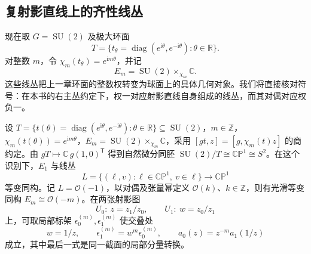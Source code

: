 \subsection{复射影直线上的齐性线丛}
\label{g1:subsec:2003:04}
现在取 \(G=\operatorname{SU}(2)\) 及极大环面
\[
	T=\{t_\theta=\operatorname{diag}(e^{\mathrm{i}\theta},e^{-\mathrm{i}\theta}):\theta\in\mathbb R\}.
\]
对整数 \(m\)，令 \(\chi_m(t_\theta)=e^{\mathrm{i}m\theta}\)，并记
\[
	E_m=\operatorname{SU}(2)\times_{\chi_m}\mathbb C.
\]
这些线丛把上一章环面的整数权转变为球面上的具体几何对象。我们将直接核对符号：在本书的右主丛约定下，权一对应射影直线自身组成的线丛，而其对偶对应权负一。

\begin{proposition}\label{g1:prop:su2-hopf-associated-lines}
	设 \(T=\{t(\theta)=\operatorname{diag}(e^{\mathrm{i}\theta},e^{-\mathrm{i}\theta}):\theta\in\mathbb R\}\subseteq\operatorname{SU}(2)\)，\(m\in\mathbb Z\)，\(\chi_m(t(\theta))=e^{\mathrm{i}m\theta}\)，\(E_m=\operatorname{SU}(2)\times_{\chi_m}\mathbb C\)，采用 \([gt,z]=[g,\chi_m(t)z]\) 的商约定。由 \(gT\mapsto\mathbb C\,g(1,0)^{\mathsf T}\) 得到自然微分同胚 \(\operatorname{SU}(2)/T\cong\mathbb{CP}^1\cong S^2\)。在这个识别下，\(E_1\) 与线丛
	\[
		L=\{(\ell,v):\ell\in\mathbb{CP}^1,\ v\in\ell\}\longrightarrow\mathbb{CP}^1
	\]
	等变同构。记 \(L=\mathcal O(-1)\)，以对偶及张量幂定义 \(\mathcal O(k)\)、\(k\in\mathbb Z\)，则有光滑等变同构 \(E_m\cong\mathcal O(-m)\)。在两张射影图
	\[
		U_0:\ z=z_1/z_0,\qquad U_1:\ w=z_0/z_1
	\]
	上，可取局部标架 \(\epsilon_0^{(m)},\epsilon_1^{(m)}\) 使交叠处
	\begin{equation}\label{g1:eq:projective-line-associated-transition}
		w=1/z,\qquad
		\epsilon_1^{(m)}=w^m\epsilon_0^{(m)},\qquad
		a_0(z)=z^{-m}a_1(1/z)
	\end{equation}
	成立，其中最后一式是同一截面的局部分量转换。
\end{proposition}

